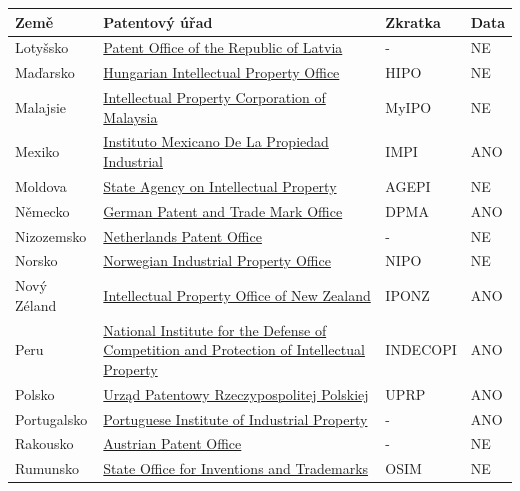 	\begin{table}[H]
	\centering
	\begin{tabular}{|>{\centering\arraybackslash}p{2.2cm}|>{\centering\arraybackslash}p{7.5cm}|>{\centering\arraybackslash}p{2cm}|>{\centering\arraybackslash}p{1cm}|} 
	\hline
	\textbf{Země}    & \textbf{Patentový úřad} & \textbf{Zkratka}        & \textbf{Data}        \\ 
	\hline
 	Lotyšsko & \href{https://www.lrpv.gov.lv/lv}{Patent Office of the Republic of Latvia}  & -    & NE     \\ 
	\hline
	Maďarsko & \href{http://www.hipo.gov.hu/}{Hungarian Intellectual Property Office}  & HIPO   & NE      \\ 
	\hline
	Malajsie & \href{http://www.myipo.gov.my/}{Intellectual Property Corporation of Malaysia}  & MyIPO  & NE       \\ 
	\hline
	Mexiko & \href{https://www.gob.mx/impi/en}{Instituto Mexicano De La Propiedad Industrial}  & IMPI  & ANO       \\ 
	\hline
	Moldova & \href{http://www.agepi.gov.md/}{State Agency on Intellectual Property}  & AGEPI   & NE      \\ 
	\hline
	Německo & \href{http://www.dpma.de/}{German Patent and Trade Mark Office}  & DPMA   & ANO      \\ 
	\hline
	Nizozemsko & \href{http://www.rvo.nl/octrooien}{Netherlands Patent Office}  & -    & NE    \\ 
	\hline
	Norsko & \href{https://www.patentstyret.no/en/}{Norwegian Industrial Property Office}  & NIPO    & NE     \\ 
	\hline
	Nový Zéland & \href{http://www.iponz.govt.nz/}{Intellectual Property Office of New Zealand}  & IPONZ   & ANO      \\ 
	\hline
	Peru & \href{http://www.indecopi.gob.pe/}{National Institute for the Defense of Competition and Protection of Intellectual Property}  & INDECOPI    & ANO     \\ 
	\hline
	Polsko & \href{https://uprp.gov.pl/pl}{Urząd Patentowy Rzeczypospolitej Polskiej}  & UPRP    & ANO     \\ 
	\hline
	Portugalsko & \href{https://inpi.justica.gov.pt/}{Portuguese Institute of Industrial Property}  & -     & ANO    \\ 
	\hline
	Rakousko & \href{http://www.patentamt.at/}{Austrian Patent Office}  & -     & NE    \\ 
	\hline
	Rumunsko & \href{http://www.osim.ro/}{State Office for Inventions and Trademarks}  & OSIM      & NE   \\ 

\end{tabular}
\end{table}
